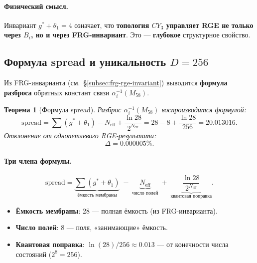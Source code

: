 \documentclass[11pt,a4paper]{article}
\newcommand{\CY}{CY_3}
\newtheorem{theorem}{Теорема}[section]
\theoremstyle{definition}
\begin{document}
\paragraph{Физический смысл.}
Инвариант $g^* + \theta_1 = 4$ означает, что \textbf{топология 
$\CY$ управляет RGE не только через $B_i$, но и через 
FRG-инвариант}. Это — \textbf{глубокое} структурное свойство.
\subsection{Формула spread и уникальность \texorpdfstring{$D = 256$}{D = 256}}
\label{subsec:spread-formula-review}

Из FRG-инварианта (см.~\S\ref{subsec:frg-rge-invariant}) 
выводится \textbf{формула разброса} обратных констант связи 
$\alpha_i^{-1}(M_{58})$.

\begin{theorem}[Формула spread]
\label{thm:spread-review}
Разброс $\alpha_i^{-1}(M_{58})$ воспроизводится формулой:
\begin{equation}
    \boxed{
    \text{spread} = \sum(g^* + \theta_1) - N_{\text{eff}}
    + \frac{\ln 28}{2^{N_{\text{eff}}}}
    = 28 - 8 + \frac{\ln 28}{256}
    = 20.013016.
    }
    \label{eq:spread-review}
\end{equation}
Отклонение от однопетлевого RGE-результата:
\begin{equation}
    \boxed{
    \Delta = 0.000005\%.
    }
    \label{eq:spread-deviation-review}
\end{equation}
\end{theorem}

\paragraph{Три члена формулы.}
\begin{equation}
    \text{spread} =
    \underbrace{\sum (g^* + \theta_1)}_{\text{ёмкость мембраны}}
    \;-\; \underbrace{N_{\text{eff}}}_{\text{число полей}}
    \;+\; \underbrace{\frac{\ln 28}{2^{N_{\text{eff}}}}}_{\text{квантовая поправка}}.
\end{equation}

\begin{itemize}
    \item \textbf{Ёмкость мембраны}: $28$ — полная ёмкость 
          (из FRG-инварианта).
    \item \textbf{Число полей}: $8$ — поля, «занимающие» ёмкость.
    \item \textbf{Квантовая поправка}: $\ln(28)/256 \approx 0.013$ — 
          от конечности числа состояний ($2^8 = 256$).
\end{itemize}
\end{document}

